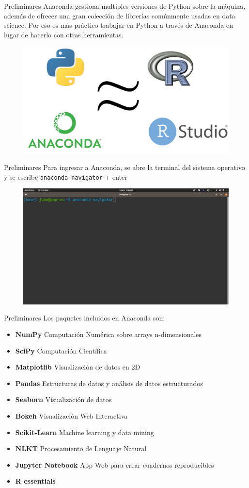 \documentclass{beamer}
\begin{document}
\begin{frame}{Preliminares}
Anaconda gestiona multiples versiones de Python
sobre la máquina, además de ofrecer una gran colección de librerías comúnmente usadas en data science. Por eso es más práctico trabajar en Python a través de Anaconda en lugar de hacerlo con otras herramientas. 
\begin{figure}
\includegraphics[width=.6\textwidth]{equivalent.png}
 \end{figure}
\end{frame}


\begin{frame}{Preliminares}
Para ingresar a Anaconda, se abre la terminal del sistema operativo y se escribe \texttt{anaconda-navigator} + enter
\begin{figure}
\includegraphics[width=.8\textwidth]{terminal.png}
 \end{figure}
\end{frame}

\begin{frame}{Preliminares}
Los paquetes incluidos en Anaconda son:
\vspace{0.5cm}
\begin{itemize}
\item \textbf{NumPy} Computación Numérica sobre arrays n-dimensionales
\item \textbf{SciPy} Computación Científica
\item \textbf{Matplotlib} Visualización de datos en 2D
\item \textbf{Pandas} Estructuras de datos y análisis de datos estructurados
\item \textbf{Seaborn} Visualización de datos
\item \textbf{Bokeh} Visualización Web Interactiva
\item \textbf{Scikit-Learn} Machine learning y data mining
\item \textbf{NLKT} Procesamiento de Lenguaje Natural
\item \textbf{Jupyter Notebook} App Web para crear cuadernos reproducibles
\item \textbf{R essentials}
\end{itemize}
\end{frame}
\end{document}
